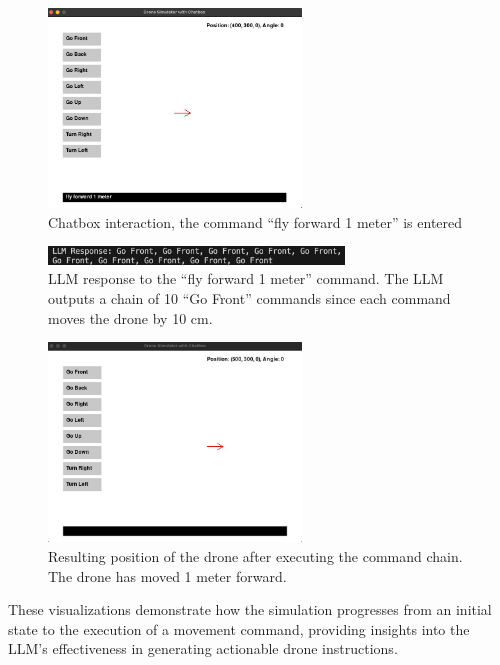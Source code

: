 \begin{figure}[H]
    \centering
    \includegraphics[width=0.6\textwidth]{img/sim_command_forward.jpeg}
    \caption{Chatbox interaction, the command ``fly forward 1 meter'' is entered}
    \label{fig:sim_command_forward}
\end{figure}

\begin{figure}[H]
    \centering
    \includegraphics[width=0.7\textwidth]{img/response_forward.jpeg}
    \caption{\ac{LLM} response to the ``fly forward 1 meter'' command. The \ac{LLM} outputs a chain of 10 ``Go Front'' commands since each command moves the drone by 10 cm.}
    \label{fig:response_forward}
\end{figure}
\begin{figure}[H]
    \centering
    \includegraphics[width=0.6\textwidth]{img/sim_pos_forward.jpeg}
    \caption{Resulting position of the drone after executing the command chain. The drone has moved 1 meter forward.}
    \label{fig:sim_pos_forward}
\end{figure}

These visualizations demonstrate how the simulation progresses from an initial state to the execution of a movement command, 
providing insights into the \ac{LLM}'s effectiveness in generating actionable drone instructions.

